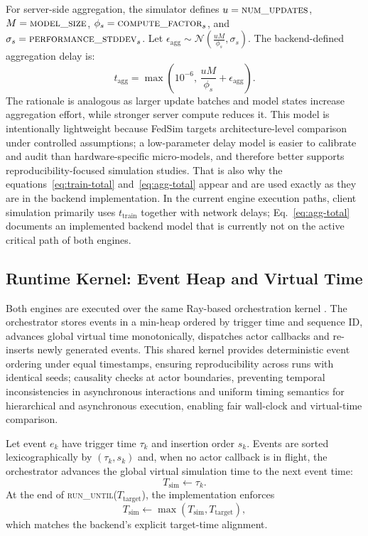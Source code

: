 \documentclass[conference]{IEEEtran}
\begin{document}
For server-side aggregation, the simulator defines
$u=\textsc{num\_updates}$, $M=\textsc{model\_size}$,
$\phi_s=\textsc{compute\_factor}_s$, and $\sigma_s=\textsc{performance\_stddev}_s$. Let
$\epsilon_{\mathrm{agg}}\sim\mathcal{N}\!\left(\frac{uM}{\phi_s},\sigma_s\right)$.
The backend-defined aggregation delay is:
\begin{equation}
t_{\mathrm{agg}}=\max\!\left(10^{-6},\,\frac{uM}{\phi_s}+\epsilon_{\mathrm{agg}}\right).
\label{eq:agg-total}
\end{equation}
The rationale is analogous as larger update batches and model states increase aggregation effort, while stronger server compute reduces it. This model is intentionally lightweight because FedSim targets architecture-level comparison under controlled assumptions; a low-parameter delay model is easier to calibrate and audit than hardware-specific micro-models, and therefore better supports reproducibility-focused simulation studies.
That is also why the equations~\ref{eq:train-total} and~\ref{eq:agg-total} appear and are used exactly as they are in the backend implementation. In the current engine execution paths, client simulation primarily uses $t_{\mathrm{train}}$ together with network delays; Eq.~\ref{eq:agg-total} documents an implemented backend model that is currently not on the active critical path of both engines.

\subsection{Runtime Kernel: Event Heap and Virtual Time}
Both engines are executed over the same Ray-based orchestration kernel \cite{moritz2018ray}. The orchestrator stores events in a min-heap ordered by trigger time and sequence ID, advances global virtual time monotonically, dispatches actor callbacks and re-inserts newly generated events. This shared kernel provides deterministic event ordering under equal timestamps, ensuring reproducibility across runs with identical seeds; causality checks at actor boundaries, preventing temporal inconsistencies in asynchronous interactions and uniform timing semantics for hierarchical and asynchronous execution, enabling fair wall-clock and virtual-time comparison.

Let event $e_k$ have trigger time $\tau_k$ and insertion order $s_k$. Events are sorted lexicographically by $(\tau_k, s_k)$ and, when no actor callback is in flight, the orchestrator advances the global virtual simulation time to the next event time:
\begin{equation}
T_{\mathrm{sim}} \leftarrow \tau_k.
\label{eq:virtual-time}
\end{equation}
At the end of \textsc{run\_until}($T_{\mathrm{target}}$), the implementation enforces
\begin{equation}
T_{\mathrm{sim}} \leftarrow \max(T_{\mathrm{sim}}, T_{\mathrm{target}}),
\label{eq:run-until-final}
\end{equation}
which matches the backend's explicit target-time alignment.
\end{document}
